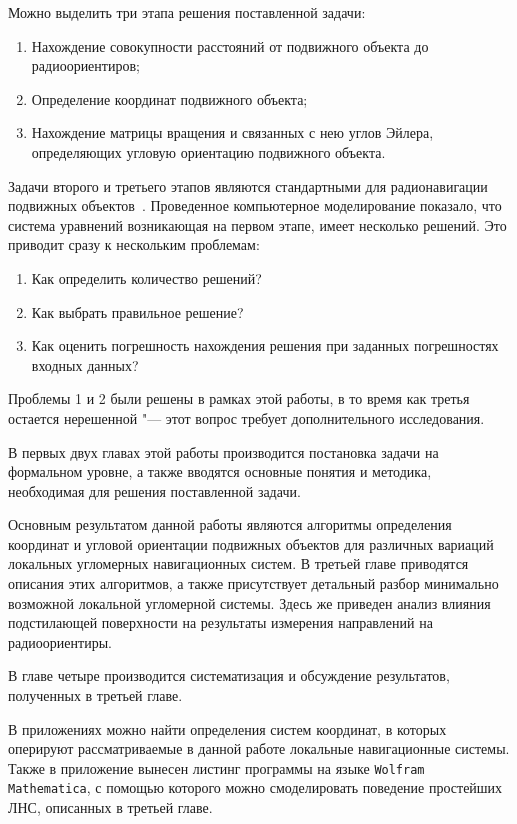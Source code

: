 \documentclass[../main.tex]{subfiles}
\begin{document}
Можно выделить три этапа решения поставленной задачи:
\begin{enumerate}
    \item Нахождение совокупности расстояний от подвижного объекта до радиоориентиров;
    \item Определение координат подвижного объекта;
    \item Нахождение матрицы вращения и связанных с нею углов Эйлера, определяющих угловую ориентацию подвижного объекта.
\end{enumerate}
Задачи второго и третьего этапов являются стандартными для радионавигации подвижных объектов~\cite{SOSULIN:1992}. Проведенное компьютерное моделирование показало, что система уравнений возникающая на первом этапе, имеет несколько решений. Это приводит сразу к нескольким проблемам:
\begin{enumerate}
    \item Как определить количество решений? \label{q:1}
    \item Как выбрать правильное решение? \label{q:2}
    \item Как оценить погрешность нахождения решения при заданных погрешностях входных данных? \label{q:3}
\end{enumerate}
Проблемы 1 и 2 были решены в рамках этой работы, в то время как третья остается нерешенной "--- этот вопрос требует дополнительного исследования.

В первых двух главах этой работы производится постановка задачи на формальном уровне, а также вводятся основные понятия и методика, необходимая для решения поставленной задачи.

Основным результатом данной работы являются алгоритмы определения координат и угловой ориентации подвижных объектов для различных вариаций локальных угломерных навигационных систем. В третьей главе приводятся описания этих алгоритмов, а также присутствует детальный разбор минимально возможной локальной угломерной системы. Здесь же приведен анализ влияния подстилающей поверхности на результаты измерения направлений на радиоориентиры.

В главе четыре производится систематизация и обсуждение результатов, полученных в третьей главе.

В приложениях можно найти определения систем координат, в которых оперируют рассматриваемые в данной работе локальные навигационные системы. Также в приложение вынесен листинг программы на языке \texttt{Wolfram Mathematica}, с помощью которого можно смоделировать поведение простейших ЛНС, описанных в третьей главе.
\end{document}
